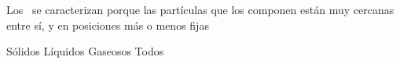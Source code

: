 
\question Los \fillin\ se caracterizan porque las partículas que
los componen están muy cercanas entre sí, y en posiciones más o menos fijas

  \begin{oneparchoices}
    \CorrectChoice Sólidos
    \choice Líquidos
    \choice Gaseosos
    \choice Todos
  \end{oneparchoices}
  \answerline[A]
